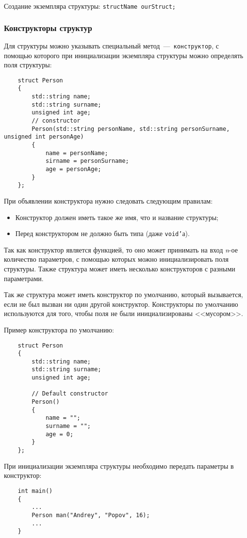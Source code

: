 Создание экземпляра структуры:
\lstinline{structName ourStruct;}

\subsubsection{Конструкторы структур}
Для структуры можно указывать специальный метод~---~\texttt{конструктор}, с помощью которого при инициализации экземпляра структуры можно определять поля структуры:
\begin{lstlisting}
    struct Person
    {
        std::string name;
        std::string surname;
        unsigned int age;
        // constructor
        Person(std::string personName, std::string personSurname, unsigned int personAge)
        {
            name = personName;
            sirname = personSurname;
            age = personAge;
        }
    };
\end{lstlisting}

При объявлении конструктора нужно следовать следующим правилам:
\begin{itemize}
    \item Конструктор должен иметь такое же имя, что и название структуры;
    \item Перед конструктором не должно быть типа (даже \texttt{void'}а).
\end{itemize}

Так как конструктор является функцией, то оно может принимать на вход \textit{n}-ое количество параметров, с помощью которых можно инициализировать поля структуры. Также структура может иметь несколько конструкторов с разными параметрами.

Так же структура может иметь конструктор по умолчанию, который вызывается, если не был вызван ни один другой конструктор. Конструкторы по умолчанию используются для того, чтобы поля не были инициализированы <<мусором>>.

Пример конструктора по умолчанию:
\begin{lstlisting}
    struct Person
    {
        std::string name;
        std::string surname;
        unsigned int age;
        
        // Default constructor
        Person()
        {
            name = "";
            surname = "";
            age = 0;
        }
    };
\end{lstlisting}


При инициализации экземпляра структуры необходимо передать параметры в конструктор:
\begin{lstlisting}
    int main()
    {
        ...
        Person man("Andrey", "Popov", 16);
        ...
    }
\end{lstlisting} 

